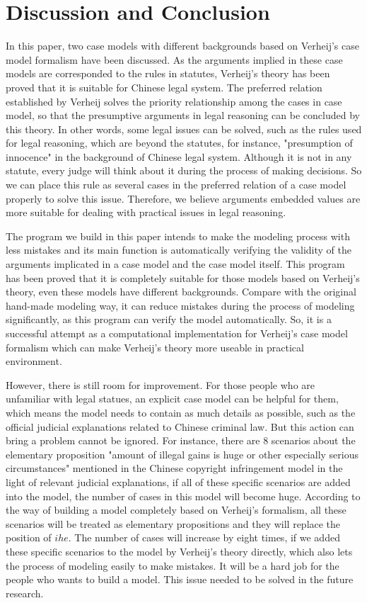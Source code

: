\documentclass{IOS-Book-Article}
\begin{document}
\section{Discussion and Conclusion}

\noindent In this paper, two case models with different backgrounds based on Verheij's case model formalism have been discussed. As the arguments implied in these case models are corresponded to the rules in statutes, Verheij's theory has been proved that it is suitable for Chinese legal system. The preferred relation established by Verheij solves the priority relationship among the cases in case model, so that the presumptive arguments in legal reasoning can be concluded by this theory. In other words, some legal issues can be solved, such as the rules used for legal reasoning, which are beyond the statutes, for instance, "presumption of innocence" in the background of Chinese legal system. Although it is not in any statute, every judge will think about it during the process of making decisions. So we can place this rule as several cases in the preferred relation of a case model properly to solve this issue. Therefore, we believe arguments embedded values are more suitable for dealing with practical issues in legal reasoning. 

The program we build in this paper intends to make the modeling process with less mistakes and its main function is automatically verifying the validity of the arguments implicated in a case model and the case model itself. This program has been proved that it is completely suitable for those models based on Verheij's theory, even these models have different backgrounds. Compare with the original hand-made modeling way, it can reduce mistakes during the process of modeling significantly, as this program can verify the model automatically. So, it is a successful attempt as a computational implementation for Verheij's case model formalism which can make Verheij's theory more useable in practical environment. 

However, there is still room for improvement. For those people who are unfamiliar with legal statues, an explicit case model can be helpful for them, which means the model needs to contain as much details as possible, such as the official judicial explanations related to Chinese criminal law. But this action can bring a problem cannot be ignored. For instance, there are 8 scenarios about the elementary proposition "amount of illegal gains is huge or other especially serious circumstances" mentioned in the Chinese copyright infringement model in the light of relevant judicial explanations, if all of these specific scenarios are added into the model, the number of cases in this model will become huge. According to the way of building a model completely based on Verheij's formalism, all these scenarios will be treated as elementary propositions and they will replace the position of  $ihe$. The number of cases will increase by eight times, if we added these specific scenarios to the model by Verheij's theory directly, which also lets the process of modeling easily to make mistakes. It will be a hard job for the people who wants to build a model. This issue needed to be solved in the future research.
\end{document}
